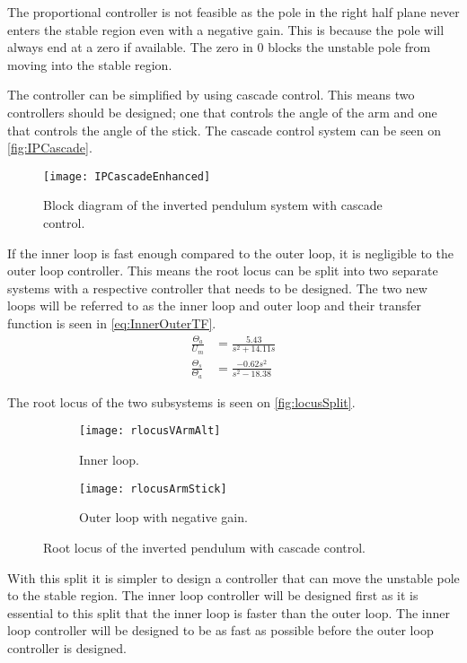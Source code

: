 The proportional controller is not feasible as the pole in the right half plane never enters the stable region even with a negative gain. This is because the pole will always end at a zero if available. The zero in 0 blocks the unstable pole from moving into the stable region.

The controller can be simplified by using cascade control. This means two controllers should be designed; one that controls the angle of the arm and one that controls the angle of the stick. The cascade control system can be seen on \autoref{fig:IPCascade}.
\begin{figure}[htbp]
\centering
\texttt{[image: IPCascadeEnhanced]}
\caption{Block diagram of the inverted pendulum system with cascade control.}
\label{fig:IPCascade}
\end{figure}

If the inner loop is fast enough compared to the outer loop, it is negligible to the outer loop controller. This means the root locus can be split into two separate systems with a respective controller that needs to be designed. The two new loops will be referred to as the inner loop and outer loop and their transfer function is seen in \autoref{eq:InnerOuterTF}.
\begin{subequations}\label{eq:InnerOuterTF}
	\begin{flalign}
		\frac{\Theta_a}{U_m}&= \frac{5.43}{s^2 + 14.11 s} \\
		\frac{\Theta_s}{\Theta_a}&=\frac{-0.62 s^2}{s^2 - 18.38}
	\end{flalign}
\end{subequations}

The root locus of the two subsystems is seen on \autoref{fig:locusSplit}.
\begin{figure}[htbp]
\centering
	\begin{subfigure}{0.45\textwidth}
	\texttt{[image: rlocusVArmAlt]}
	\caption{Inner loop.}
	\label{fig:locusVArm}
	\end{subfigure}
	\begin{subfigure}{0.45\textwidth}
	\texttt{[image: rlocusArmStick]}
	\caption{Outer loop with negative gain.}
	\end{subfigure}
\caption{Root locus of the inverted pendulum with cascade control.}
\label{fig:locusSplit}
\end{figure}

With this split it is simpler to design a controller that can move the unstable pole to the stable region. The inner loop controller will be designed first as it is essential to this split that the inner loop is faster than the outer loop. The inner loop controller will be designed to be as fast as possible before the outer loop controller is designed.
